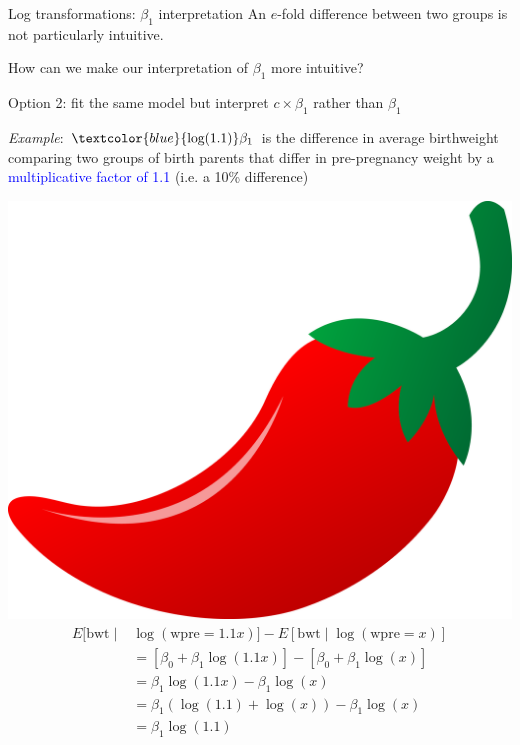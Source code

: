 \documentclass[10pt,t]{beamer}
\begin{document}
\begin{frame}{Log transformations: $\beta_1$ interpretation}
An $e$-fold difference between two groups is not particularly intuitive.

How can we make our interpretation of $\beta_1$ more intuitive?

\vspace{0.3cm}

Option 2: fit the same model but interpret $c \times \beta_1$ rather than $\beta_1$

\vspace{0.3cm}

\textit{Example}: $\textcolor{blue}{\text{log}(1.1)}\beta_1$ is the difference in average birthweight comparing two groups of birth parents that differ in pre-pregnancy weight by a \textcolor{blue}{multiplicative factor of 1.1} (i.e. a 10\% difference)

\includegraphics[scale=0.01]{chilipepper.png}
\begin{align*}
E[\text{bwt} \mid & \log(\text{wpre} = 1.1x)] - E[\text{bwt} \mid \log(\text{wpre} = x)] \\
& = [\beta_0 + \beta_1 \log(1.1x)] - [\beta_0 + \beta_1 \log(x)] \\
& = \beta_1 \log(1.1x) - \beta_1 \log(x) \\
& = \beta_1 (\log(1.1) + \log(x)) - \beta_1 \log(x) \\
& = \beta_1 \log(1.1)
\end{align*}

\end{frame}
\end{document}
